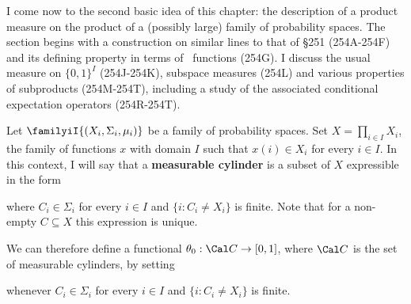 
\def\chaptername{Product measures}
\def\sectionname{Infinite products}


I come now to the second basic idea of this
chapter:  the description of a product measure on the product of a
(possibly large) family of probability spaces.   The section begins with
a construction on similar lines to that of \S251 (254A-254F) and its
defining property in terms of \imp\ functions (254G).   I discuss the
usual measure on $\{0,1\}^I$
(254J-254K), subspace measures (254L) and various properties of
subproducts (254M-254T), including a study of the associated conditional
expectation operators (254R-254T).

 Let $\familyiI{(X_i,\Sigma_i,\mu_i)}$ be
a family of probability
spaces.   Set $X=\prod_{i\in I}X_i$, the family of functions $x$ with
domain $I$ such that $x(i)\in X_i$ for every $i\in I$.   In this
context, I will say that a {\bf measurable cylinder} is a subset of $X$
expressible in the form


\noindent where $C_i\in\Sigma_i$ for every $i\in I$ and
$\{i:C_i\ne X_i\}$ is finite.   Note that for a non-empty $C\subseteq X$
this expression is unique.   

 We can therefore define a functional
$\theta_0:\Cal C\to[0,1]$, where $\Cal C$ is the set of measurable
cylinders, by setting


\noindent whenever  $C_i\in\Sigma_i$ for every $i\in I$ and
$\{i:C_i\ne X_i\}$ is finite.

